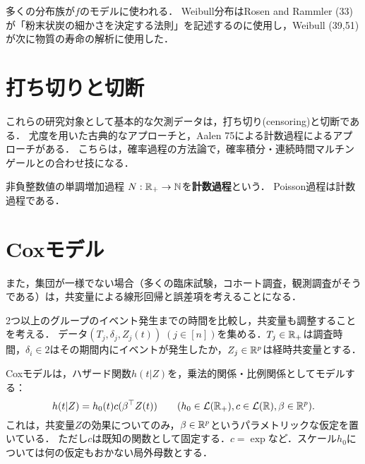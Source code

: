\documentclass[uplatex,dvipdfmx]{jsreport}
\begin{document}
\begin{remarks}
    多くの分布族が$f$のモデルに使われる．
    Weibull分布はRosen and Rammler (33)が「粉末状炭の細かさを決定する法則」を記述するのに使用し，Weibull (39,51)が次に物質の寿命の解析に使用した．
\end{remarks}

\section{打ち切りと切断}

\begin{tcolorbox}[colframe=ForestGreen, colback=ForestGreen!10!white,breakable,colbacktitle=ForestGreen!40!white,coltitle=black,fonttitle=\bfseries\sffamily,
title=]
    これらの研究対象として基本的な欠測データは，打ち切り(censoring)と切断である．
    尤度を用いた古典的なアプローチと，Aalen 75による計数過程によるアプローチがある．
    こちらは，確率過程の方法論で，確率積分・連続時間マルチンゲールとの合わせ技になる．
\end{tcolorbox}

\begin{definition}
    非負整数値の単調増加過程
    $N:\mathbb{R}_+\to\mathbb{N}$を\textbf{計数過程}という．
    Poisson過程は計数過程である．
\end{definition}


\section{Coxモデル}

\begin{tcolorbox}[colframe=ForestGreen, colback=ForestGreen!10!white,breakable,colbacktitle=ForestGreen!40!white,coltitle=black,fonttitle=\bfseries\sffamily,
title=]
また，集団が一様でない場合（多くの臨床試験，コホート調査，観測調査がそうである）は，共変量による線形回帰と誤差項を考えることになる．
\end{tcolorbox}

\begin{notation}
    2つ以上のグループのイベント発生までの時間を比較し，共変量も調整することを考える．
    データ$(T_j,\delta_j,Z_j(t))\;(j\in[n])$を集める．$T_j\in\mathbb{R}_+$は調査時間，$\delta_i\in 2$はその期間内にイベントが発生したか，$Z_j\in\mathbb{R}^p$は経時共変量とする．
\end{notation}

\begin{model}
    Coxモデルは，ハザード関数$h(t|Z)$を，乗法的関係・比例関係としてモデルする：
    \[h(t|Z)=h_0(t)c(\beta^\top Z(t))\qquad(h_0\in\mathcal{L}(\mathbb{R}_+),c\in\mathcal{L}(\mathbb{R}),\beta\in\mathbb{R}^p).\]
    これは，共変量$Z$の効果についてのみ，$\beta\in\mathbb{R}^p$というパラメトリックな仮定を置いている．
    ただし$c$は既知の関数として固定する．$c=\exp$など．スケール$h_0$については何の仮定もおかない局外母数とする．
\end{model}
\end{document}
